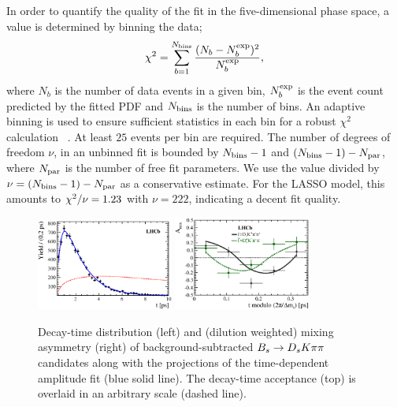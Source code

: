 In order to quantify the quality of the fit in the five-dimensional phase space,
a \chisq value is determined by binning the data;
\begin{equation}
	\chi^{2} = \sum_{b=1}^{N_{\rm bins}} \frac{(N_{b}-N_{b}^{\rm exp})^{2}}{N_{b}^{\rm exp}},
\end{equation}
where $N_{b}$ is the number of data events in a given bin, 
$N_{b}^{\rm exp}$ is the event count predicted by the fitted PDF
and $N_{\rm bins}$ is the number of bins.
An adaptive binning
is used to ensure sufficient statistics in each bin for a robust $\chi^{2}$ calculation ~\cite{KKpipi}.
At least $25$ events per bin are required.
The number of degrees of freedom $\nu$, in an unbinned fit is bounded by $N_{\rm bins}-1$ and $(N_{\rm bins}- 1) - N_{\rm par}$, 
where $N_{\rm par}$ is the number of free fit parameters.
We use the \chisq value divided by $\nu = (N_{\rm bins}-1) - N_{\rm par}$ as a conservative estimate.
For the LASSO model, this 
amounts to $\chi^2/\nu = 1.23$ with $\nu = 222$,
indicating a decent fit quality.

\begin{figure}[h]
	\centering		
		\includegraphics[width=0.4\textwidth, height = !]{figs/fullFit/signal_new/h_t.eps} 
		\includegraphics[width=0.4\textwidth, height = !]{figs/fullFit/signal_new/h_asym.eps} 		
		\caption{Decay-time distribution (left) and (dilution weighted) mixing asymmetry (right)
		 of background-subtracted $B_s\rightarrow{\ensuremath{{D}_{s}}}{\ensuremath{K}}{\ensuremath{\pi}}{\ensuremath{\pi}}$  candidates along with the projections of the time-dependent amplitude fit (blue solid line).
		 		 The decay-time acceptance (top) is overlaid in an arbitrary scale (dashed line).
		 } 		
		\label{fig:fullFit2}		
\end{figure}

